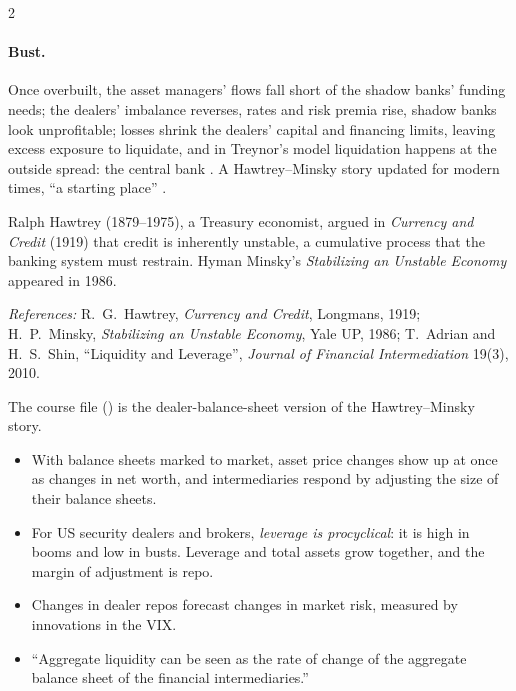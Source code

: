 \begin{paracol}{2}
\paragraph{Bust.} Once overbuilt, the asset managers' flows fall short of the shadow banks' funding needs; the dealers' imbalance reverses, rates and risk premia rise,
shadow banks look unprofitable; losses shrink the dealers' capital and financing limits, leaving excess exposure to liquidate, and in Treynor's model liquidation
happens at the outside spread: the central bank . A Hawtrey--Minsky story updated for
modern times, ``a starting place'' .

\begin{history}
Ralph Hawtrey (1879--1975), a Treasury economist, argued in \emph{Currency and Credit} (1919) that credit is inherently unstable, a cumulative process that the
banking system must restrain. Hyman Minsky's \emph{Stabilizing an Unstable Economy} appeared in 1986.\par
\emph{References:} R.~G.~Hawtrey, \emph{Currency and Credit}, Longmans, 1919; H.~P.~Minsky, \emph{Stabilizing an Unstable Economy}, Yale UP, 1986; T.~Adrian and
H.~S.~Shin, ``Liquidity and Leverage'', \emph{Journal of Financial Intermediation} 19(3), 2010.
\end{history}

\begin{reading}
The course file () is the dealer-balance-sheet version of the Hawtrey--Minsky story.
\begin{itemize}
  \item With balance sheets marked to market, asset price changes show up at once as changes in net worth, and intermediaries respond by adjusting the size of their balance sheets.
  \item For US security dealers and brokers, \emph{leverage is procyclical}: it is high in booms and low in busts. Leverage and total assets grow together, and the margin of adjustment is repo.
  \item Changes in dealer repos forecast changes in market risk, measured by innovations in the VIX.
  \item ``Aggregate liquidity can be seen as the rate of change of the aggregate balance sheet of the financial intermediaries.''
\end{itemize}
\end{reading}


\end{paracol}
